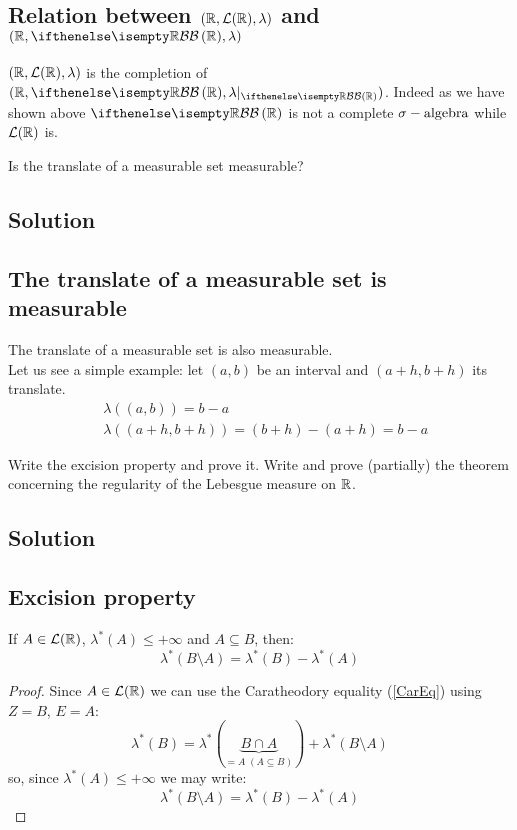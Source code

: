 \subsection{Relation between \texorpdfstring{$(\mathbb{R},\mathcal{L}(\mathbb{R}),\lambda)$}{(R,L(R),l)} and \texorpdfstring{$(\R,\B[\R],\lambda)$}{(R,B(R),l)}}
$(\mathbb{R},\mathcal{L}(\mathbb{R}),\lambda)$ is the completion of $(\R,\B[\R],\lambda|_{\B[\R]})$. Indeed as we have shown above $\B[\R]$ is not a complete $\sigma-\text{algebra}$ while $\mathcal{L}(\mathbb{R})$ is.


\question
Is the translate of a measurable set measurable?

\subsection*{Solution}

\subsection{The translate of a measurable set is measurable}
The translate of a measurable set is also measurable. \\
Let us see a simple example: let $(a,b)$ be an interval and $(a+h,b+h)$ its translate.
\begin{align*}
     & \lambda((a,b)) = b-a                   \\
     & \lambda((a+h,b+h)) = (b+h)-(a+h) = b-a
\end{align*}


\question
Write the excision property and prove it. Write and prove (partially) the theorem concerning
the regularity of the Lebesgue measure on $\mathbb{R}$.

\subsection*{Solution}
\subsection{Excision property}\label{ExcProp}
If $A\in\mathcal{L}(\mathbb{R})$, $\lambda^*(A)\leq +\infty$ and $A\subseteq B$, then:
\[
    \lambda^*(B\setminus A) = \lambda^* (B) - \lambda^*(A)
\]
\begin{proof}
    Since $A\in\mathcal{L}(\mathbb{R})$ we can use the Caratheodory equality (\ref{CarEq}) using $Z=B$, $E=A$:
    \[
        \lambda^*(B) = \lambda^*(\underbrace{B\cap A}_{=A \; (A\subseteq B)}) + \lambda^* (B\setminus A)
    \]
    so, since $\lambda^*(A)\leq +\infty$ we may write:
    \[
        \lambda^*(B\setminus A) = \lambda^*(B)-\lambda^*(A)
    \]
\end{proof}

